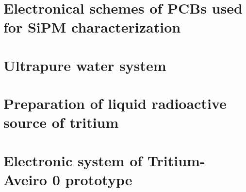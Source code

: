 \documentclass[12pt,a4paper]{book}
\begin{document}
\chapter{Electronical schemes of PCBs used for SiPM characterization}\label{App:ElectronicalSchemesSiPMPCBs}


\chapter{Ultrapure water system}\label{App:UltraPureWaterSystem}


\chapter{Preparation of liquid radioactive source of tritium}\label{App:TritiumSourcePreparation}


\chapter{Electronic system of Tritium-Aveiro 0 prototype}\label{App:ElectronicSystemAveiro}



\end{document}
